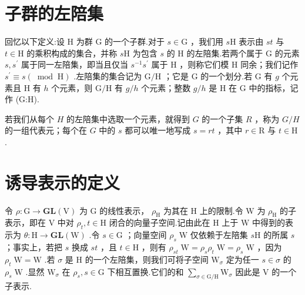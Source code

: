 \documentclass[10pt]{article}
\begin{document}
\section*{子群的左陪集}

回忆以下定义:设 \(\mathrm{H}\) 为群 G 的一个子群.对于 \(s \in  \mathrm{G}\) ，我们用 \(s\mathrm{H}\) 表示由 \({st}\) 与 \(t \in  \mathrm{H}\) 的乘积构成的集合，并称 \(s\mathrm{H}\) 为包含 \(s\) 的 \(\mathrm{H}\) 的左陪集.若两个属于 \(\mathrm{G}\) 的元素 \(s,{s}^{\prime }\) 属于同一左陪集，即当且仅当 \({s}^{-1}{s}^{\prime }\) 属于 \(\mathrm{H}\) ，则称它们模 \(\mathrm{H}\) 同余；我们记作 \({s}^{\prime } \equiv  s\left( {\;\operatorname{mod}\;\mathrm{H}}\right)\) .左陪集的集合记为 \(\mathrm{G}/\mathrm{H}\) ；它是 \(\mathrm{G}\) 的一个划分.若 \(\mathrm{G}\) 有 \(g\) 个元素且 \(\mathrm{H}\) 有 \(h\) 个元素，则 \(\mathrm{G}/\mathrm{H}\) 有 \(g/h\) 个元素；整数 \(g/h\) 是 \(\mathrm{H}\) 在 \(\mathrm{G}\) 中的指标，记作 (G:H).

若我们从每个 \(H\) 的左陪集中选取一个元素，就得到 \(G\) 的一个子集 \(R\) ，称为 \(G/H\) 的一组代表元；每个在 \(G\) 中的 \(s\) 都可以唯一地写成 \(s = {rt}\) ，其中 \(r \in  \mathrm{R}\) 与 \(t \in  \mathrm{H}\) .

\section*{诱导表示的定义}

令 \(\rho  : \mathrm{G} \rightarrow  \mathbf{{GL}}\left( \mathrm{V}\right)\) 为 \(\mathrm{G}\) 的线性表示， \({\rho }_{\mathrm{H}}\) 为其在 \(\mathrm{H}\) 上的限制.令 \(\mathrm{W}\) 为 \({\rho }_{\mathrm{H}}\) 的子表示，即在 \(\mathrm{V}\) 中对 \({\rho }_{t},t \in  \mathrm{H}\) 闭合的向量子空间.记由此在 \(\mathrm{H}\) 上于 \(\mathrm{W}\) 中得到的表示为 \(\theta  : \mathrm{H} \rightarrow  \mathbf{{GL}}\left( \mathrm{W}\right)\) .令 \(s \in  \mathrm{G}\) ；向量空间 \({\rho }_{s}\mathrm{\;W}\) 仅依赖于左陪集 \(s\mathrm{H}\) 的所属 \(s\) ；事实上，若把 \(s\) 换成 \({st}\) ，且 \(t \in  \mathrm{H}\) ，则有 \({\rho }_{st}\mathrm{\;W} = {\rho }_{s}{\rho }_{t}\mathrm{\;W} = {\rho }_{s}\mathrm{\;W}\) ，因为 \({\rho }_{t}\mathrm{\;W} = \mathrm{W}\) .若 \(\sigma\) 是 \(\mathrm{H}\) 的一个左陪集，则我们可将子空间 \({\mathrm{W}}_{\sigma }\) 定为任一 \(s \in  \sigma\) 的 \({\rho }_{s}\mathrm{\;W}\) .显然 \({\mathrm{W}}_{\sigma }\) 在 \({\rho }_{s},s \in  \mathrm{G}\) 下相互置换.它们的和 \(\mathop{\sum }\limits_{{\sigma  \in  \mathrm{G}/\mathrm{H}}}{\mathrm{W}}_{\sigma }\) 因此是 \(\mathrm{V}\) 的一个子表示.
\end{document}
